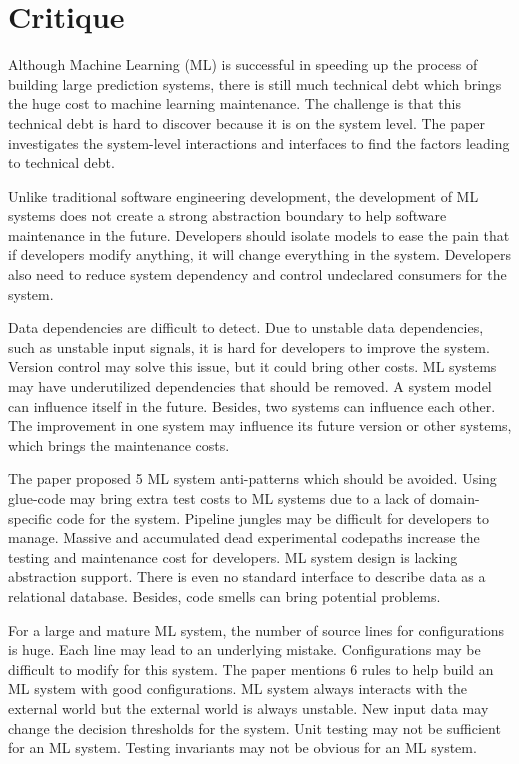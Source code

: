 \section*{Critique}

Although Machine Learning (ML) is successful in speeding up the process of building large prediction systems, there is still much technical debt which brings the huge cost to machine learning maintenance. The challenge is that this technical debt is hard to discover because it is on the system level. The paper investigates the system-level interactions and interfaces to find the factors leading to technical debt. 

Unlike traditional software engineering development, the development of ML systems does not create a strong abstraction boundary to help software maintenance in the future. Developers should isolate models to ease the pain that if developers modify anything, it will change everything in the system. Developers also need to reduce system dependency and control undeclared consumers for the system.

Data dependencies are difficult to detect. Due to unstable data dependencies, such as unstable input signals, it is hard for developers to improve the system. Version control may solve this issue, but it could bring other costs. ML systems may have underutilized dependencies that should be removed.
A system model can influence itself in the future. Besides, two systems can influence each other. The improvement in one system may influence its future version or other systems, which brings the maintenance costs.

The paper proposed 5 ML system anti-patterns which should be avoided. Using glue-code may bring extra test costs to ML systems due to a lack of domain-specific code for the system. Pipeline jungles may be difficult for developers to manage. Massive and accumulated dead experimental codepaths increase the testing and maintenance cost for developers. ML system design is lacking abstraction support. There is even no standard interface to describe data as a relational database. Besides, code smells can bring potential problems.

For a large and mature ML system, the number of source lines for configurations is huge. Each line may lead to an underlying mistake. Configurations may be difficult to modify for this system. The paper mentions 6 rules to help build an ML system with good configurations.
ML system always interacts with the external world but the external world is always unstable. New input data may change the decision thresholds for the system. Unit testing may not be sufficient for an ML system. Testing invariants may not be obvious for an ML system.  

